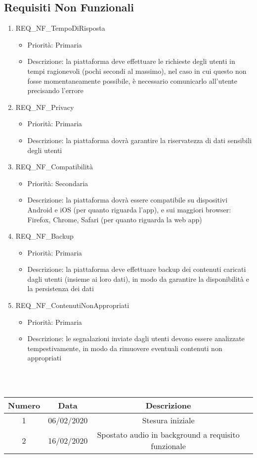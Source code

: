 \subsection{Requisiti Non Funzionali}

\begin{enumerate}	
	\item REQ\_NF\_TempoDiRisposta
		\begin{itemize}
		\item Priorità: Primaria
		\item Descrizione: la piattaforma deve effettuare le richieste degli utenti in tempi ragionevoli (pochi secondi al massimo), nel caso in cui questo non fosse momentaneamente possibile, è necessario comunicarlo all'utente precisando l'errore
		\end{itemize}

	\item REQ\_NF\_Privacy
		\begin{itemize}
		\item Priorità: Primaria
		\item Descrizione: la piattaforma dovrà garantire la riservatezza di dati sensibili degli utenti
		\end{itemize}

	\item REQ\_NF\_Compatibilità
		\begin{itemize}
		\item Priorità: Secondaria
		\item Descrizione: la piattaforma dovrà essere compatibile su dispositivi Android e iOS (per quanto riguarda l'app), e sui maggiori browser: Firefox, Chrome, Safari (per quanto riguarda la web app)
		\end{itemize}
	
	\item REQ\_NF\_Backup
		\begin{itemize}
		\item Priorità: Primaria
		\item Descrizione: la piattaforma deve effettuare backup dei contenuti caricati dagli utenti (insieme ai loro dati), in modo da garantire la disponibilità e la persistenza dei dati
		\end{itemize}

	\item REQ\_NF\_ContenutiNonAppropriati
		\begin{itemize}
		\item Priorità: Primaria
		\item Descrizione: le segnalazioni inviate dagli utenti devono essere analizzate tempestivamente, in modo da rimuovere eventuali contenuti non appropriati
		\end{itemize}

\end{enumerate}

 \\ \\
\begin{tabular}{|c | c | c | c|} 
 	\hline
	 Numero & Data & Descrizione \\ [0.5ex] 
	\hline\hline
	1 & 06/02/2020 & Stesura iniziale \\ 
	\hline
	2 & 16/02/2020 & Spostato audio in background a requisito funzionale \\
	\hline
\end{tabular}
